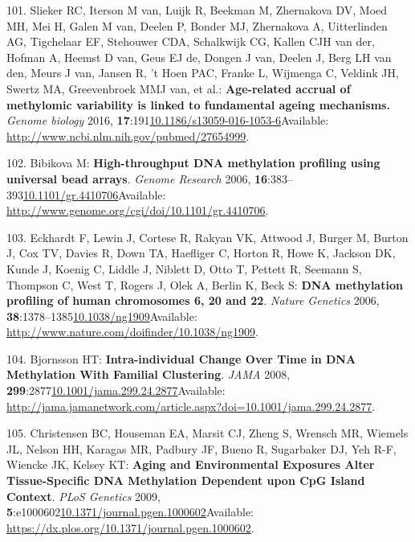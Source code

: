 \documentclass[
]{book}
\begin{document}
\leavevmode\hypertarget{ref-Slieker2016}{}%
101. Slieker RC, Iterson M van, Luijk R, Beekman M, Zhernakova DV, Moed MH, Mei H, Galen M van, Deelen P, Bonder MJ, Zhernakova A, Uitterlinden AG, Tigchelaar EF, Stehouwer CDA, Schalkwijk CG, Kallen CJH van der, Hofman A, Heemst D van, Geus EJ de, Dongen J van, Deelen J, Berg LH van den, Meurs J van, Jansen R, 't Hoen PAC, Franke L, Wijmenga C, Veldink JH, Swertz MA, Greevenbroek MMJ van, et al.: \textbf{Age-related accrual of methylomic variability is linked to fundamental ageing mechanisms.} \emph{Genome biology} 2016, \textbf{17}:191\href{https://doi.org/10.1186/s13059-016-1053-6}{10.1186/s13059-016-1053-6}Available: \url{http://www.ncbi.nlm.nih.gov/pubmed/27654999}.

\leavevmode\hypertarget{ref-Bibikova2006}{}%
102. Bibikova M: \textbf{High-throughput DNA methylation profiling using universal bead arrays}. \emph{Genome Research} 2006, \textbf{16}:383--393\href{https://doi.org/10.1101/gr.4410706}{10.1101/gr.4410706}Available: \url{http://www.genome.org/cgi/doi/10.1101/gr.4410706}.

\leavevmode\hypertarget{ref-Eckhardt2006}{}%
103. Eckhardt F, Lewin J, Cortese R, Rakyan VK, Attwood J, Burger M, Burton J, Cox TV, Davies R, Down TA, Haefliger C, Horton R, Howe K, Jackson DK, Kunde J, Koenig C, Liddle J, Niblett D, Otto T, Pettett R, Seemann S, Thompson C, West T, Rogers J, Olek A, Berlin K, Beck S: \textbf{DNA methylation profiling of human chromosomes 6, 20 and 22}. \emph{Nature Genetics} 2006, \textbf{38}:1378--1385\href{https://doi.org/10.1038/ng1909}{10.1038/ng1909}Available: \url{http://www.nature.com/doifinder/10.1038/ng1909}.

\leavevmode\hypertarget{ref-Bjornsson2008}{}%
104. Bjornsson HT: \textbf{Intra-individual Change Over Time in DNA Methylation With Familial Clustering}. \emph{JAMA} 2008, \textbf{299}:2877\href{https://doi.org/10.1001/jama.299.24.2877}{10.1001/jama.299.24.2877}Available: \url{http://jama.jamanetwork.com/article.aspx?doi=10.1001/jama.299.24.2877}.

\leavevmode\hypertarget{ref-Christensen2009}{}%
105. Christensen BC, Houseman EA, Marsit CJ, Zheng S, Wrensch MR, Wiemels JL, Nelson HH, Karagas MR, Padbury JF, Bueno R, Sugarbaker DJ, Yeh R-F, Wiencke JK, Kelsey KT: \textbf{Aging and Environmental Exposures Alter Tissue-Specific DNA Methylation Dependent upon CpG Island Context}. \emph{PLoS Genetics} 2009, \textbf{5}:e1000602\href{https://doi.org/10.1371/journal.pgen.1000602}{10.1371/journal.pgen.1000602}Available: \url{https://dx.plos.org/10.1371/journal.pgen.1000602}.
\end{document}
